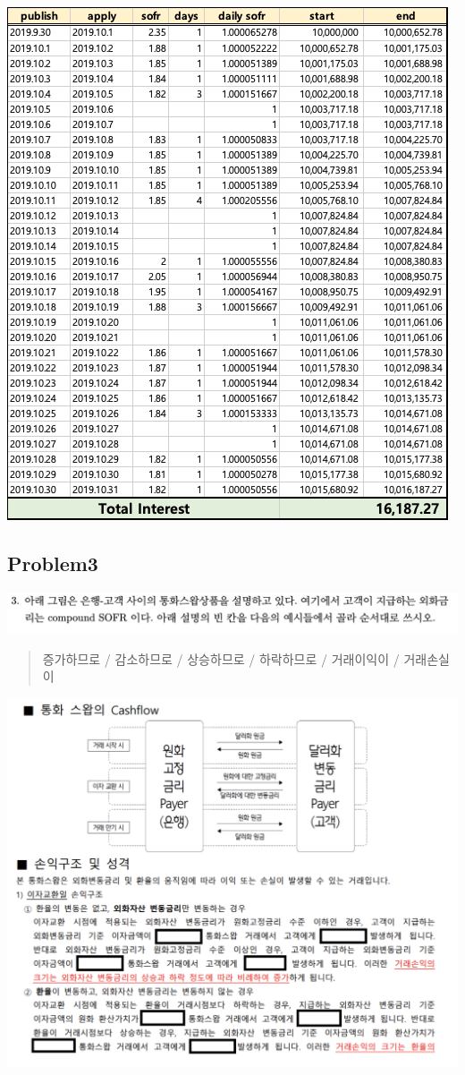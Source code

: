 \documentclass[
  a4paper,
  DIV=11,
  numbers=noendperiod]{scrreprt}
\begin{document}
\includegraphics{images/이자율hw1_2_answer.png}

\subsection*{Problem3}\label{problem3}

\includegraphics{images/이자율hw1_3.png}

\begin{quote}
증가하므로 / 감소하므로 / 상승하므로 / 하락하므로 / 거래이익이 /
거래손실이
\end{quote}

\includegraphics{images/이자율hw1_4.png}
\end{document}
